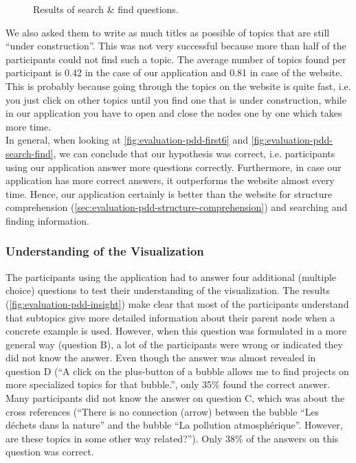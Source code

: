 \begin{figure}[H]
	\centering
	\caption{Results of search \& find questions.}
	\label{fig:evaluation-pdd-search-find}
\end{figure}

We also asked them to write as much titles as possible of topics that are still ``under construction''. This was not very successful because more than half of the participants could not find such a topic. The average number of topics found per participant is 0.42 in the case of our application and 0.81 in case of the website. This is probably because going through the topics on the website is quite fast, i.e. you just click on other topics until you find one that is under construction, while in our application you have to open and close the nodes one by one which takes more time.\\

In general, when looking at \autoref{fig:evaluation-pdd-first6} and \autoref{fig:evaluation-pdd-search-find}, we can conclude that our hypothesis was correct, i.e. participants using our application answer more questions correctly. Furthermore, in case our application has more correct answers, it outperforms the website almost every time. Hence, our application certainly is better than the website for structure comprehension (\autoref{sec:evaluation-pdd-structure-comprehension}) and searching and finding information.

\subsubsection{Understanding of the Visualization}
The participants using the application had to answer four additional (multiple choice) questions to test their understanding of the visualization. The results (\autoref{fig:evaluation-pdd-insight}) make clear that most of the participants understand that subtopics give more detailed information about their parent node when a concrete example is used. However, when this question was formulated in a more general way (question B), a lot of the participants were wrong or indicated they did not know the answer. Even though the answer was almost revealed in question D (``A click on the plus-button of a bubble allows me to find projects on more specialized topics for that bubble.'', only 35\% found the correct answer.\\

Many participants did not know the answer on question C, which was about the cross references (``There is no connection (arrow) between the bubble ``Les d\'echets dans la nature'' and the bubble ``La pollution atmosph\'erique''. However, are these topics in some other way related?''). Only 38\% of the answers on this question was correct.\\

